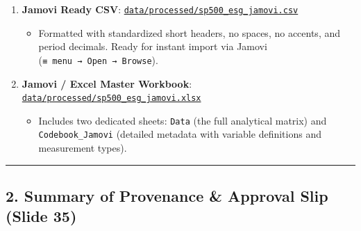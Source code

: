 \documentclass[
]{article}
\providecommand{\tightlist}{%
  \setlength{\itemsep}{0pt}\setlength{\parskip}{0pt}}
\begin{document}
\begin{enumerate}
\def\labelenumi{\arabic{enumi}.}
\tightlist
\item
  \textbf{Jamovi Ready CSV}:
  \href{file:///Users/david/Library/Mobile\%20Documents/com~apple~CloudDocs/Etudes\%20Supp/EMN\%20M1\%20/M1\%20-\%20S7/Data\%20Analysis\%20Quantitative/Group\%20Work\%20S&P\%20500/data/processed/sp500_esg_jamovi.csv}{\texttt{data/processed/sp500\_esg\_jamovi.csv}}

  \begin{itemize}
  \tightlist
  \item
    Formatted with standardized short headers, no spaces, no accents,
    and period decimals. Ready for instant import via Jamovi
    (\texttt{≡\ menu\ →\ Open\ →\ Browse}).
  \end{itemize}
\item
  \textbf{Jamovi / Excel Master Workbook}:
  \href{file:///Users/david/Library/Mobile\%20Documents/com~apple~CloudDocs/Etudes\%20Supp/EMN\%20M1\%20/M1\%20-\%20S7/Data\%20Analysis\%20Quantitative/Group\%20Work\%20S&P\%20500/data/processed/sp500_esg_jamovi.xlsx}{\texttt{data/processed/sp500\_esg\_jamovi.xlsx}}

  \begin{itemize}
  \tightlist
  \item
    Includes two dedicated sheets: \texttt{Data} (the full analytical
    matrix) and \texttt{Codebook\_Jamovi} (detailed metadata with
    variable definitions and measurement types).
  \end{itemize}
\end{enumerate}

\begin{center}\rule{0.5\linewidth}{0.5pt}\end{center}

\subsection{2. Summary of Provenance \& Approval Slip (Slide
35)}\label{summary-of-provenance-approval-slip-slide-35}
\end{document}
